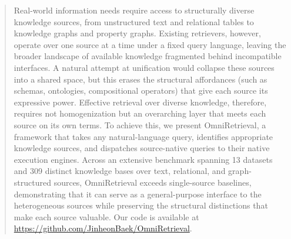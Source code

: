 \begin{abstract}
Real-world information needs require access to structurally diverse knowledge sources, from unstructured text and relational tables to knowledge graphs and property graphs. Existing retrievers, however, operate over one source at a time under a fixed query language, leaving the broader landscape of available knowledge fragmented behind incompatible interfaces. A natural attempt at unification would collapse these sources into a shared space, but this erases the structural affordances (such as schemas, ontologies, compositional operators) that give each source its expressive power. Effective retrieval over diverse knowledge, therefore, requires not homogenization but an overarching layer that meets each source on its own terms. To achieve this, we present OmniRetrieval, a framework that takes any natural-language query, identifies appropriate knowledge sources, and dispatches source-native queries to their native execution engines. Across an extensive benchmark spanning 13 datasets and 309 distinct knowledge bases over text, relational, and graph-structured sources, OmniRetrieval exceeds single-source baselines, demonstrating that it can serve as a general-purpose interface to the heterogeneous sources while preserving the structural distinctions that make each source valuable. Our code is available at \url{https://github.com/JinheonBaek/OmniRetrieval}.
\end{abstract}